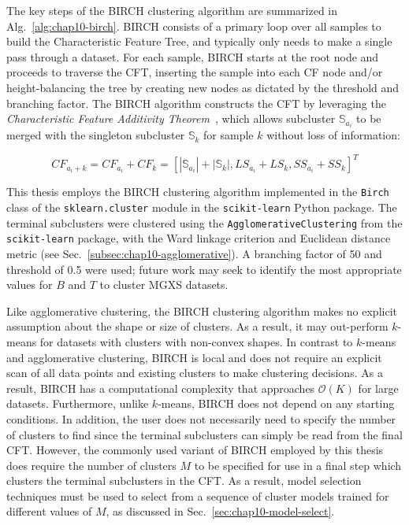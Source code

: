 The key steps of the BIRCH clustering algorithm are summarized in Alg.~\ref{alg:chap10-birch}. BIRCH consists of a primary loop over all samples to build the Characteristic Feature Tree, and typically only needs to make a single pass through a dataset. For each sample, BIRCH starts at the root node and proceeds to traverse the CFT, inserting the sample into each CF node and/or height-balancing the tree by creating new nodes as dictated by the threshold and branching factor. The BIRCH algorithm constructs the CFT by leveraging the \textit{Characteristic Feature Additivity Theorem}~\cite{zhang1996birch}, which allows subcluster $\mathbb{S}_{a_{i}}$ to be merged with the singleton subcluster $\mathbb{S}_{k}$ for sample $k$ without loss of information:

\begin{equation}
\label{eqn:chap10-birch-cf-additivity}
CF_{a_{i}+k} = CF_{a_{i}} + CF_{k} = \left[|\mathbb{S}_{a_{i}}| + |\mathbb{S}_{k}|, LS_{a_{i}} + LS_{k}, SS_{a_{i}} + SS_{k}\right]^{T}
\end{equation}

This thesis employs the BIRCH clustering algorithm implemented in the \texttt{Birch} class of the \texttt{sklearn.cluster} module in the \texttt{scikit-learn} Python package. The terminal subclusters were clustered using the \texttt{AgglomerativeClustering} from the \texttt{scikit-learn} package, with the Ward linkage criterion and Euclidean distance metric (see Sec.~\ref{subsec:chap10-agglomerative}). A branching factor of 50 and threshold of 0.5 were used; future work may seek to identify the most appropriate values for $B$ and $T$ to cluster \ac{MGXS} datasets.

Like agglomerative clustering, the BIRCH clustering algorithm makes no explicit assumption about the shape or size of clusters. As a result, it may out-perform $k$-means for datasets with clusters with non-convex shapes. In contrast to $k$-means and agglomerative clustering, BIRCH is local and does not require an explicit scan of all data points and existing clusters to make clustering decisions. As a result, BIRCH has a computational complexity that approaches $\mathcal{O}(K)$ for large datasets. Furthermore, unlike $k$-means, BIRCH does not depend on any starting conditions. In addition, the user does not necessarily need to specify the number of clusters to find since the terminal subclusters can simply be read from the final CFT. However, the commonly used variant of BIRCH employed by this thesis does require the number of clusters $M$ to be specified for use in a final step which clusters the terminal subclusters in the CFT. As a result, model selection techniques must be used to select from a sequence of cluster models trained for different values of $M$, as discussed in Sec.~\ref{sec:chap10-model-select}.

